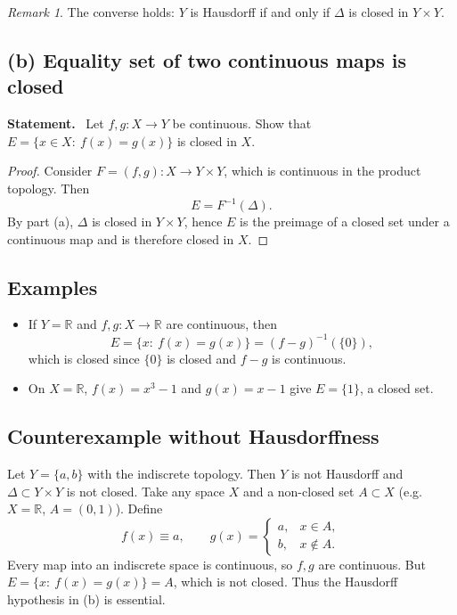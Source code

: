 \documentclass[12pt,a4paper]{article}
\newenvironment{statement}{\par\noindent\textbf{Statement.}\ }{\par}
\theoremstyle{plain}
\theoremstyle{definition}
\theoremstyle{remark}
\newtheorem*{remark}{Remark} %
\theoremstyle{remark}
\begin{document}
	\begin{remark}
		The converse holds: $Y$ is Hausdorff if and only if $\Delta$ is closed in $Y\times Y$.
	\end{remark}
	
	\subsection*{(b) Equality set of two continuous maps is closed}
	\begin{statement}
		Let $f,g:X\to Y$ be continuous. Show that $E=\{x\in X:\ f(x)=g(x)\}$ is closed in $X$.
	\end{statement}
	
	\begin{proof}
		Consider $F=(f,g):X\to Y\times Y$, which is continuous in the product topology. Then
		\[
		E=F^{-1}(\Delta).
		\]
		By part (a), $\Delta$ is closed in $Y\times Y$, hence $E$ is the preimage of a closed set under a continuous map and is therefore closed in $X$.
	\end{proof}
	
	\subsection*{Examples}
	\begin{itemize}
		\item If $Y=\mathbb{R}$ and $f,g:X\to\mathbb{R}$ are continuous, then
		\[
		E=\{x:\ f(x)=g(x)\}=(f-g)^{-1}(\{0\}),
		\]
		which is closed since $\{0\}$ is closed and $f-g$ is continuous.
		\item On $X=\mathbb{R}$, $f(x)=x^3-1$ and $g(x)=x-1$ give $E=\{1\}$, a closed set.
	\end{itemize}
	
	\subsection*{Counterexample without Hausdorffness}
	Let $Y=\{a,b\}$ with the indiscrete topology. Then $Y$ is not Hausdorff and $\Delta\subset Y\times Y$ is not closed. Take any space $X$ and a non-closed set $A\subset X$ (e.g.\ $X=\mathbb{R}$, $A=(0,1)$). Define
	\[
	f(x)\equiv a,\qquad
	g(x)=\begin{cases}
		a,& x\in A,\\
		b,& x\notin A.
	\end{cases}
	\]
	Every map into an indiscrete space is continuous, so $f,g$ are continuous. But
	$E=\{x:\ f(x)=g(x)\}=A$, which is not closed. Thus the Hausdorff hypothesis in (b) is essential.
	
\end{document}
